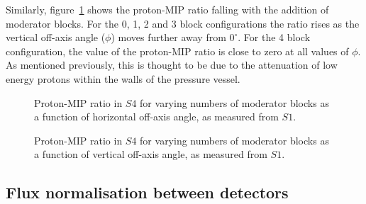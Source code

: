 Similarly, figure~\ref{fig:propiratio_s4_vert} shows the proton-MIP ratio falling with the addition of moderator blocks.
For the 0, 1, 2 and 3 block configurations the ratio rises as the vertical off-axis angle ($\phi$) moves further away from $0^{\circ}$. 
For the 4 block configuration, the value of the proton-MIP ratio is close to zero at all values of $\phi$.
As mentioned previously, this is thought to be due to the attenuation of low energy protons within the walls of the pressure vessel.

\begin{figure}[!ht]
  \begin{minipage}[t]{0.48\textwidth}
    \begin{adjustbox}{max totalsize={\textwidth}{.35\textheight}, center}
      
    \end{adjustbox}
    \caption{Proton-MIP ratio in $\mathit{S4}$ for varying numbers of moderator blocks as a function of horizontal off-axis angle, as measured from $\mathit{S1}$.}
    \label{fig:propiratio_s4_horz}
  \end{minipage}
  \hspace{0.3cm}
  \begin{minipage}[t]{0.48\textwidth}
    \begin{adjustbox}{max totalsize={\textwidth}{.35\textheight}, center}
      
    \end{adjustbox}
    \caption{Proton-MIP ratio in $\mathit{S4}$ for varying numbers of moderator blocks as a function of vertical off-axis angle, as measured from $\mathit{S1}$.}
    \label{fig:propiratio_s4_vert}
  \end{minipage}	
\end{figure}

\subsection{Flux normalisation between detectors}

